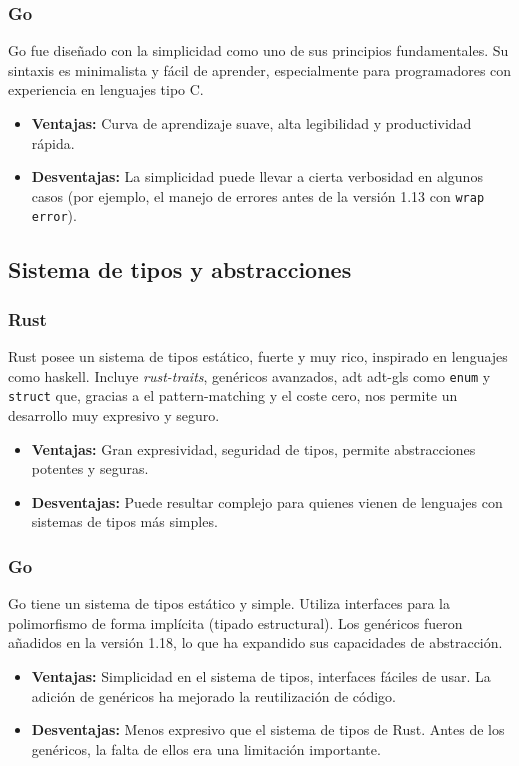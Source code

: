 \subsubsection{Go}

Go fue diseñado con la simplicidad como uno de sus principios fundamentales. Su sintaxis es minimalista y fácil de aprender, especialmente para programadores con experiencia en lenguajes tipo C.
\begin{itemize}
    \item \textbf{Ventajas:} Curva de aprendizaje suave, alta legibilidad y productividad rápida.
    \item \textbf{Desventajas:} La simplicidad puede llevar a cierta verbosidad en algunos casos (por ejemplo, el manejo de errores antes de la versión 1.13 con \texttt{wrap error}).
\end{itemize}

\subsection{Sistema de tipos y abstracciones}
\subsubsection{Rust}

Rust posee un sistema de tipos estático, fuerte y muy rico, inspirado en lenguajes como \gls{haskell}. Incluye \textit{\gls{rust-traits}}, genéricos avanzados, \acrlong{adt} \gls{adt-gls} como \texttt{enum} y \texttt{struct} que, gracias a el \gls{pattern-matching} y el coste cero, nos permite un desarrollo muy expresivo y seguro.
\begin{itemize}
    \item \textbf{Ventajas:} Gran expresividad, seguridad de tipos, permite abstracciones potentes y seguras.
    \item \textbf{Desventajas:} Puede resultar complejo para quienes vienen de lenguajes con sistemas de tipos más simples.
\end{itemize}

\subsubsection{Go}

Go tiene un sistema de tipos estático y simple. Utiliza interfaces para la polimorfismo de forma implícita (tipado estructural). Los genéricos fueron añadidos en la versión 1.18, lo que ha expandido sus capacidades de abstracción.
\begin{itemize}
    \item \textbf{Ventajas:} Simplicidad en el sistema de tipos, interfaces fáciles de usar. La adición de genéricos ha mejorado la reutilización de código.
    \item \textbf{Desventajas:} Menos expresivo que el sistema de tipos de Rust. Antes de los genéricos, la falta de ellos era una limitación importante.
\end{itemize}

